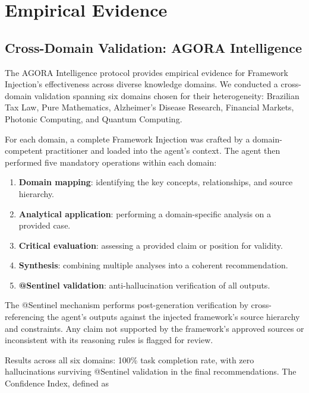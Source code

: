 \documentclass[12pt,a4paper]{article}
\begin{document}
\section{Empirical Evidence}
\label{sec:empirical}

\subsection{Cross-Domain Validation: AGORA Intelligence}
\label{sec:empirical:agora}

The AGORA Intelligence protocol provides empirical evidence for Framework Injection's effectiveness across diverse knowledge domains. We conducted a cross-domain validation spanning six domains chosen for their heterogeneity: Brazilian Tax Law, Pure Mathematics, Alzheimer's Disease Research, Financial Markets, Photonic Computing, and Quantum Computing.

For each domain, a complete Framework Injection was crafted by a domain-competent practitioner and loaded into the agent's context. The agent then performed five mandatory operations within each domain:

\begin{enumerate}
    \item \textbf{Domain mapping}: identifying the key concepts, relationships, and source hierarchy.
    \item \textbf{Analytical application}: performing a domain-specific analysis on a provided case.
    \item \textbf{Critical evaluation}: assessing a provided claim or position for validity.
    \item \textbf{Synthesis}: combining multiple analyses into a coherent recommendation.
    \item \textbf{@Sentinel validation}: anti-hallucination verification of all outputs.
\end{enumerate}

The @Sentinel mechanism performs post-generation verification by cross-referencing the agent's outputs against the injected framework's source hierarchy and constraints. Any claim not supported by the framework's approved sources or inconsistent with its reasoning rules is flagged for review.

Results across all six domains: 100\% task completion rate, with zero hallucinations surviving @Sentinel validation in the final recommendations. The Confidence Index, defined as
\end{document}
